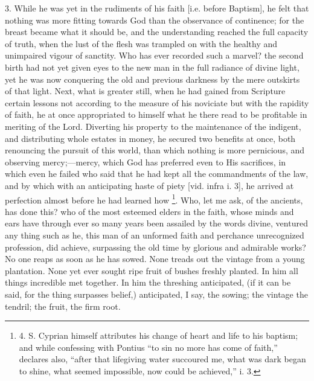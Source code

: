 3. While he was yet in the rudiments of his
faith [i.e. before Baptism],
he felt that nothing was more fitting towards God than the observance
of continence; for the breast became what it should be, and the
understanding reached the full capacity of truth, when the lust of the
flesh was trampled on with the healthy and unimpaired vigour of
sanctity. Who has ever recorded such a marvel? the second birth had
not yet given eyes to the new man in the full radiance of divine
light, yet he was now conquering the old and previous darkness by the
mere outskirts of that light. Next, what is greater still, when he had
gained from Scripture certain lessons not according to the measure of
his noviciate but with the rapidity of faith, he at once appropriated to himself what he there read to be profitable in
meriting of the Lord. Diverting his property to the maintenance of the
indigent, and distributing whole estates in money, he secured two
benefits at once, both renouncing the pursuit of this world, than
which nothing is more pernicious, and observing mercy;—mercy, which
God has preferred even to His sacrifices, in which even he failed who
said that he had kept all the commandments of the law, and by which
with an anticipating haste of piety [vid. infra i. 3], he arrived at
perfection almost before he had learned how \footnote{4. S.
Cyprian himself attributes his change of heart and life to his
baptism; and while confessing with Pontius ``to sin no more has come of
faith,'' declares also, ``after that lifegiving water succoured me, what
was dark began to shine, what seemed impossible, now could be
achieved,'' i. 3.}. Who, let me ask, of the ancients, has done this? who of the
most esteemed elders in the faith, whose minds and ears have through
ever so many years been assailed by the words divine, ventured any
thing such as he, this man of an unformed faith and perchance
unrecognized profession, did achieve, surpassing the old time by
glorious and admirable works? No one reaps as soon as he has sowed.
None treads out the vintage from a young plantation. None yet ever
sought ripe fruit of bushes freshly planted. In him all things
incredible met together. In him the threshing anticipated, (if it can
be said, for the thing surpasses belief,) anticipated, I say, the
sowing; the vintage the tendril; the fruit, the firm root.

